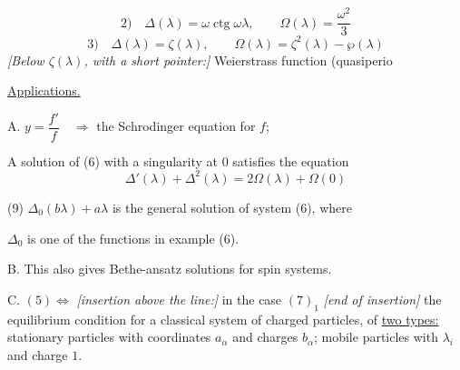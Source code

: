 \begin{equation*}
2)\quad \Delta(\lambda)=\omega\operatorname{ctg}\omega\lambda,
\qquad \Omega(\lambda)=\frac{\omega^2}{3}
\end{equation*}
\begin{equation*}
3)\quad \Delta(\lambda)=\zeta(\lambda),
\qquad \Omega(\lambda)=\zeta^2(\lambda)-\wp(\lambda)
\end{equation*}
\textit{[Below $\zeta(\lambda)$, with a short pointer:]} Weierstrass function
\qquad (quasiperio

\underline{Applications.}

A. $y=\dfrac{f'}{f}\quad\Rightarrow$ the Schrodinger equation for $f$;

A solution of (6) with a singularity at $0$ satisfies the equation
\begin{equation*}
\Delta'(\lambda)+\Delta^2(\lambda)=2\Omega(\lambda)+\Omega(0)
\tag{8}
\end{equation*}

\begin{center}
\end{center}

(9) $\Delta_0(b\lambda)+a\lambda$ is the general solution of system (6), where

$\Delta_0$ is one of the functions in example (6).

B. This also gives Bethe-ansatz solutions for spin systems.

C. $(5)\Leftrightarrow$
\textit{[insertion above the line:]} in the case
$(7)_1$ \textit{[end of insertion]}
the equilibrium condition for a classical system of charged particles, of
\underline{two types:} stationary particles with coordinates $a_\alpha$ and charges $b_\alpha$;
mobile particles with
$\lambda_i$ and charge $1$.

